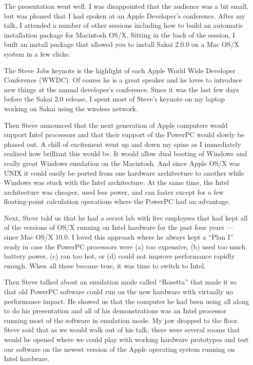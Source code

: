 \documentclass[12pt]{book}
\begin{document}
The presentation went well.  I was disappointed that the audience
was a bit small, but was pleased that I had spoken at an
Apple Developer's conference.  After my talk, I attended
a number of other sessions including how to build an
automatic installation package for Macintosh OS/X.  Sitting
in the back of the session, I built an install package that
allowed you to install Sakai 2.0.0 on a Mac OS/X system in a few clicks.

The Steve Jobs keynote is the highlight of each Apple World Wide Developer Conference
(WWDC).  Of course he is a great speaker
and he loves to introduce new things at the annual developer's
conference.  Since it was the last few days before the Sakai 2.0
release, I spent most of Steve's keynote on my laptop
working on Sakai using the wireless network.

Then Steve announced that the next generation of Apple computers
would support Intel processors and that their support
of the PowerPC would slowly be phased out.  A chill of excitement
went up and down my spine as I immediately realized how brilliant
this would be.  It would allow dual booting of Windows
and really great Windows emulation on the Macintosh.  And
since Apple OS/X was UNIX it could easily be ported from one
hardware architecture
to another while Windows was stuck with the Intel
architecture.  At the same time, the Intel architecture was
cheaper, used less power, and ran faster except for a few
floating-point calculation operations where the PowerPC
had an advantage.

Next, Steve told us that he had a secret lab with five employees
that had kept all of the versions of OS/X running on Intel
hardware for the past four years --- since Mac OS/X 10.0.
I loved this approach where he always kept a ``Plan I''
ready in case the PowerPC processors were
(a) too expensive, (b) used too much battery power, (c)
ran too hot, or (d) could not improve performance rapidly
enough.  When all these became true, it was time to switch
to Intel.

Then Steve talked about an emulation mode called ``Rosetta''
that made it so that old PowerPC software could run on the
new hardware with virtually no performance impact.
He showed us that the computer he had been using all
along to do his presentation and all of his demonstrations
was an Intel processor running most of the software in
emulation mode.  My jaw dropped to the floor.  Steve said
that as we would walk out of his talk, there were several
rooms that would be opened where we could play with working
hardware prototypes and test our software on the newest
version of the Apple operating system running on Intel
hardware.
\end{document}
